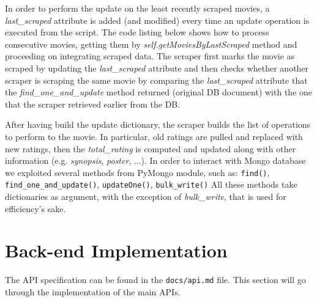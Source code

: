 \documentclass[11pt]{article}
\begin{document}
In order to perform the update on the least recently scraped movies, a \emph{last\_scraped} attribute is added (and modified) every time an update operation is executed from the script. The code listing below shows how to process consecutive movies, getting them by \emph{self.\-get\-Movies\-By\-Last\-Scraped} method and proceeding on integrating scraped data.
The scraper first marks the movie as scraped by updating the \emph{last\_scraped} attribute and then checks whether another scraper is scraping the same movie by comparing the \emph{last\_scraped} attribute that the \emph{find\_one\_and\_update} method returned (original DB document) with the one that the scraper retrieved earlier from the DB.

After having build the update dictionary, the scraper builds the list of operations to perform to the movie. In particular, old ratings are pulled and replaced with new ratings, then the \emph{total\_rating} is computed and updated along with other information (e.g. \emph{synopsis}, \emph{poster}, ...). In order to interact with Mongo database we exploited several methods from PyMongo module, such as: \texttt{find()}, \texttt{find\_one\_and\_update()}, \texttt{updateOne()}, \texttt{bulk\_write()}
All these methods take dictionaries as argument, with the exception of \emph{bulk\_write}, that is used for efficiency's sake.




\section{Back-end Implementation}
The API specification can be found in the \texttt{docs/api.md} file. This section will go through the implementation of the main APIs. 
\end{document}
